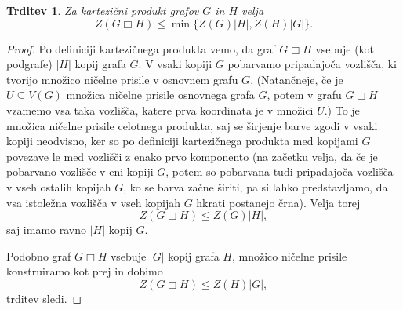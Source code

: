 \documentclass[12pt,a4paper,twoside]{article}
\theoremstyle{definition} %
\theoremstyle{plain} %
\newtheorem{trditev}[definicija]{Trditev}
\numberwithin{equation}{section}  %
\DeclareMathOperator{\boxempty}{\Box}
\begin{document}
\begin{trditev}
    \label{trd:kartezicni-produkt-zgornja-meja}
    Za kartezični produkt grafov $G$ in $H$ velja
    \begin{equation}
        Z(G \boxempty H) \leq \min\{Z(G) |H|, Z(H) |G|\}.
        \label{eq:kartezicni-produkt-zgornja-meja}
    \end{equation}
\end{trditev}
\begin{proof}
    Po definiciji kartezičnega produkta vemo, da graf $G \boxempty H$ vsebuje (kot podgrafe) $|H|$ kopij grafa $G$. V vsaki kopiji $G$ pobarvamo pripadajoča vozlišča, ki tvorijo množico ničelne prisile v osnovnem grafu $G$. (Natančneje, če je $U \subseteq V(G)$ množica ničelne prisile osnovnega grafa $G$, potem v grafu $G \boxempty H$ vzamemo vsa taka vozlišča, katere prva koordinata je v množici $U$.) To je množica ničelne prisile celotnega produkta, saj se širjenje barve zgodi v vsaki kopiji neodvisno, ker so po definiciji kartezičnega produkta med kopijami $G$ povezave le med vozlišči z enako prvo komponento (na začetku velja, da če je pobarvano vozlišče v eni kopiji $G$, potem so pobarvana tudi pripadajoča vozlišča v vseh ostalih kopijah $G$, ko se barva začne širiti, pa si lahko predstavljamo, da vsa istoležna vozlišča v vseh kopijah $G$ hkrati postanejo črna). Velja torej
    \[ Z(G \boxempty H) \leq Z(G) |H|, \]
    saj imamo ravno $|H|$ kopij $G$.
    
    Podobno graf $G \boxempty H$ vsebuje $|G|$ kopij grafa $H$, množico ničelne prisile konstruiramo kot prej in dobimo 
    \[ Z(G \boxempty H)  \leq Z(H) |G|, \]
    trditev sledi.
\end{proof}
\end{document}
